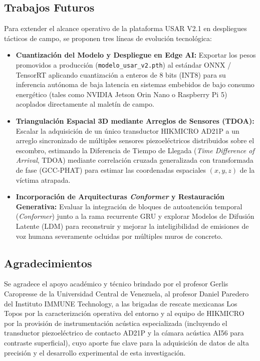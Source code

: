 \documentclass[11pt, a4paper]{article}
\begin{document}
\subsection{Trabajos Futuros}
Para extender el alcance operativo de la plataforma USAR V2.1 en despliegues tácticos de campo, se proponen tres líneas de evolución tecnológica:
\begin{itemize}
    \item \textbf{Cuantización del Modelo y Despliegue en Edge AI:} Exportar los pesos promovidos a producción (\texttt{modelo\_usar\_v2.pth}) al estándar ONNX / TensorRT aplicando cuantización a enteros de 8 bits (INT8) para su inferencia autónoma de baja latencia en sistemas embebidos de bajo consumo energético (tales como NVIDIA Jetson Orin Nano o Raspberry Pi 5) acoplados directamente al maletín de campo.
    \item \textbf{Triangulación Espacial 3D mediante Arreglos de Sensores (TDOA):} Escalar la adquisición de un único transductor HIKMICRO AD21P a un arreglo sincronizado de múltiples sensores piezoeléctricos distribuidos sobre el escombro, estimando la Diferencia de Tiempo de Llegada (\textit{Time Difference of Arrival}, TDOA) mediante correlación cruzada generalizada con transformada de fase (GCC-PHAT) para estimar las coordenadas espaciales $(x, y, z)$ de la víctima atrapada.
    \item \textbf{Incorporación de Arquitecturas \textit{Conformer} y Restauración Generativa:} Evaluar la integración de bloques de autoatención temporal (\textit{Conformer}) junto a la rama recurrente GRU y explorar Modelos de Difusión Latente (LDM) para reconstruir y mejorar la inteligibilidad de emisiones de voz humana severamente ocluidas por múltiples muros de concreto.
\end{itemize}

\subsection*{Agradecimientos}
Se agradece el apoyo académico y técnico brindado por el profesor Gerlis Caropresse de la Universidad Central de Venezuela, al profesor Daniel Paredero del Instituto IMMUNE Technology, a las brigadas de rescate mexicanas Los Topos por la caracterización operativa del entorno y al equipo de HIKMICRO por la provisión de instrumentación acústica especializada (incluyendo el transductor piezoeléctrico de contacto AD21P y la cámara acústica AI56 para contraste superficial), cuyo aporte fue clave para la adquisición de datos de alta precisión y el desarrollo experimental de esta investigación.
\end{document}
